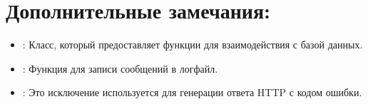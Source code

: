 \documentclass[letterpaper,10pt,russian]{sphinxmanual}
\begin{document}
\section{Дополнительные замечания:}
\label{\detokenize{src/devices/devices:id2}}\begin{itemize}
\item {} 
\sphinxAtStartPar
{}: Класс, который предоставляет функции для взаимодействия с базой данных.

\item {} 
\sphinxAtStartPar
{}:  Функция для записи сообщений в лог\sphinxhyphen{}файл.

\item {} 
\sphinxAtStartPar
{}:  Это исключение используется для генерации ответа HTTP с кодом ошибки.

\end{itemize}
\end{document}
